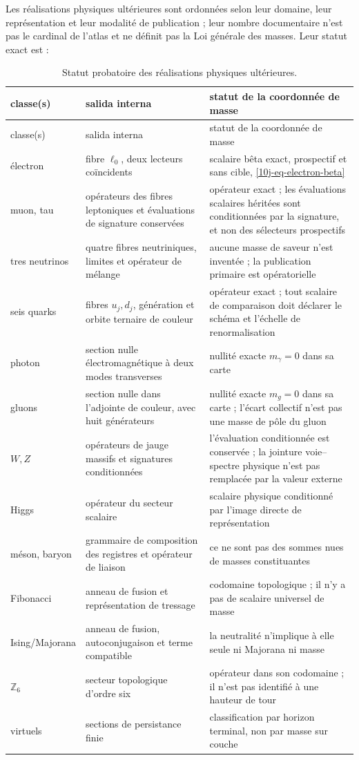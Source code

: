 Les réalisations physiques ultérieures sont ordonnées selon leur domaine, leur représentation et leur modalité de publication ; leur nombre documentaire n'est pas le cardinal de l'atlas et ne définit pas la Loi générale des masses. Leur statut exact est :
\begin{longtable}{@{}p{}p{}p{}@{}}
\caption{Statut probatoire des réalisations physiques ultérieures.}
\label{10j-tab-realizaciones-fisicas}\\
\toprule
classe(s)&salida interna&statut de la coordonnée de masse\\
\midrule
\endfirsthead
\toprule
classe(s)&salida interna&statut de la coordonnée de masse\\
\midrule
\endhead
électron&fibre \(\ell_0\), deux lecteurs coïncidents&scalaire bêta exact, prospectif et sans cible, \eqref{10j-eq-electron-beta}\\
muon, tau&opérateurs des fibres leptoniques et évaluations de signature conservées&opérateur exact ; les évaluations scalaires héritées sont conditionnées par la signature, et non des sélecteurs prospectifs\\
tres neutrinos&quatre fibres neutriniques, limites et opérateur de mélange&aucune masse de saveur n'est inventée ; la publication primaire est opératorielle\\
seis quarks&fibres \(u_j,d_j\), génération et orbite ternaire de couleur&opérateur exact ; tout scalaire de comparaison doit déclarer le schéma et l'échelle de renormalisation\\
photon&section nulle électromagnétique à deux modes transverses&nullité exacte \(m_\gamma=0\) dans sa carte\\
gluons&section nulle dans l'adjointe de couleur, avec huit générateurs&nullité exacte \(m_g=0\) dans sa carte ; l'écart collectif n'est pas une masse de pôle du gluon\\
\(W,Z\)&opérateurs de jauge massifs et signatures conditionnées&l'évaluation conditionnée est conservée ; la jointure voie--spectre physique n'est pas remplacée par la valeur externe\\
Higgs
&opérateur du secteur scalaire&scalaire physique conditionné par l'image directe de représentation\\
méson, baryon&grammaire de composition des registres et opérateur de liaison&ce ne sont pas des sommes nues de masses constituantes\\
Fibonacci
&anneau de fusion et représentation de tressage&codomaine topologique ; il n'y a pas de scalaire universel de masse\\
Ising/Majorana&anneau de fusion, autoconjugaison et terme compatible&la neutralité n'implique à elle seule ni Majorana ni masse\\
\(\mathbb Z_6\)&secteur topologique d'ordre six&opérateur dans son codomaine ; il n'est pas identifié à une hauteur de tour\\
virtuels&sections de persistance finie&classification par horizon terminal, non par masse sur couche\\
\bottomrule
\end{longtable}

